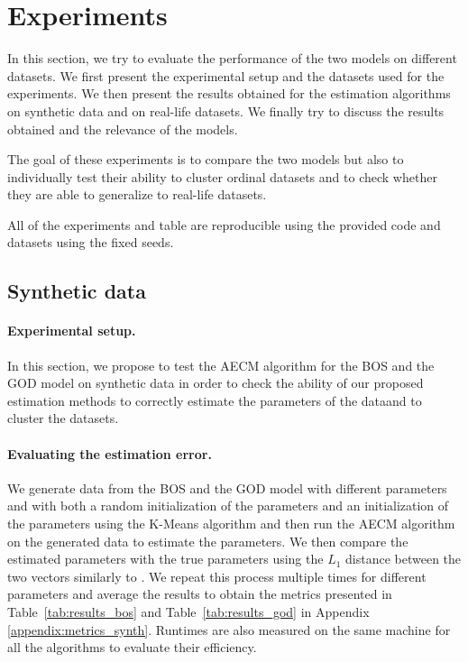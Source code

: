 \section{Experiments}
In this section, we try to evaluate the performance of the two models on different datasets. We first present the experimental setup and the datasets used for the experiments. We then present the results obtained for the estimation algorithms on synthetic data and on real-life datasets. We finally try to discuss the results obtained and the relevance of the models. 

The goal of these experiments is to compare the two models but also to individually test their ability to cluster ordinal datasets and to check whether they are able to generalize to real-life datasets.

All of the experiments and table are reproducible using the provided code and datasets using the fixed seeds.

\subsection{Synthetic data}
\paragraph{Experimental setup.}
In this section, we propose to test the AECM algorithm for the BOS and the GOD model on synthetic data in order to check the ability of our proposed estimation methods to correctly estimate the parameters of the dataand to cluster the datasets. 

\paragraph{Evaluating the estimation error.}
We generate data from the BOS and the GOD model with different parameters and with both a random initialization of the parameters and an initialization of the parameters using the K-Means algorithm and then run the AECM algorithm on the generated data to estimate the parameters. We then compare the estimated parameters with the true parameters using the $L_1$ distance between the two vectors similarly to \cite{biernacki2016model}. We repeat this process multiple times for different parameters and average the results to obtain the metrics presented in Table~\ref{tab:results_bos} and Table~\ref{tab:results_god} in Appendix \ref{appendix:metrics_synth}. Runtimes are also measured on the same machine for all the algorithms to evaluate their efficiency.
 \\ \\

